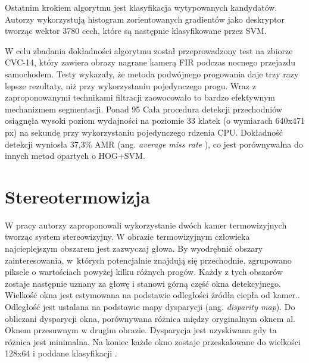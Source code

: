 Ostatnim krokiem algorytmu jest klasyfikacja wytypowanych kandydatów. 
Autorzy wykorzystują histogram zorientowanych gradientów jako deskryptor tworząc wektor 3780 cech, które są następnie klasyfikowane przez SVM.

W celu zbadania dokładności algorytmu został przeprowadzony test na zbiorze CVC-14, który zawiera obrazy nagrane kamerą FIR podczas nocnego przejazdu samochodem. 
Testy wykazały, że metoda podwójnego progowania daje trzy razy lepsze rezultaty, niż przy wykorzystaniu pojedynczego progu.  Wraz z zaproponowanymi technikami filtracji zaowocowało to bardzo efektywnym mechanizmem segmentacji. Ponad 95%
Cała procedura detekcji przechodniów osiągnęła wysoki poziom wydajności na poziomie 33 klatek (o wymiarach 640x471 px) na sekundę przy wykorzystaniu pojedynczego rdzenia CPU. Dokładność detekcji wyniosła 37,3\% AMR
(ang. \textit{ average miss rate }), co jest porównywalna do innych metod opartych o HOG+SVM.

\section{Stereotermowizja}
W pracy \cite{suard2006pedestrian} autorzy zaproponowali wykorzystanie dwóch kamer termowizyjnych tworząc system stereowizyjny. W obrazie termowizyjnym człowieka najcieplejszym obszarem jest zazwyczaj głowa. By wyodrębnić obszary zainteresowania, w~których potencjalnie znajdują się przechodnie, zgrupowano piksele o wartościach powyżej kilku różnych progów. Każdy z tych obszarów zostaje następnie uznany za głowę i stanowi górną część okna detekcyjnego. Wielkość okna jest estymowana na podstawie odległości źródła ciepła od kamer.. Odległość jest ustalana na podstawie mapy dysparycji (ang. \textit{disparity map}). Do obliczani dysparycji okna, porównywana różnica między oryginalnym oknem al. Oknem przesuwnym w drugim obrazie. Dysparycja jest uzyskiwana gdy ta różnica jest minimalna. Na koniec każde okno zostaje przeskalowane do wielkości 128x64 i poddane klasyfikacji . %

